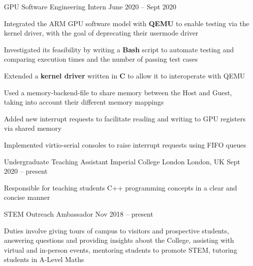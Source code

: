 \begin{cventries}
\cventry
{GPU Software Engineering Intern} %
{} %
{} %
{June 2020 -- Sept 2020} %
{
  \begin{cvitems} %
    \item Integrated the ARM GPU software model with \textbf{QEMU} to enable testing via the kernel driver, with the goal of deprecating their usermode driver
    \item Investigated its feasibility by writing a \textbf{Bash} script to automate testing and comparing execution times and the number of passing test cases
    \item Extended a \textbf{kernel driver} written in \textbf{C} to allow it to interoperate with QEMU
    \item Used a memory-backend-file to share memory between the Host and Guest, taking into account their different memory mappings
    \item Added new interrupt requests to facilitate reading and writing to GPU registers via shared memory
    \item Implemented virtio-serial consoles to raise interrupt requests using FIFO queues 
  \end{cvitems}
}


\cventry
{Undergraduate Teaching Assistant} %
{Imperial College London} %
{London, UK} %
{Sept 2020 -- present} %
{
  \begin{cvitems} %
    \item Responsible for teaching students C++ programming concepts in a clear and concise manner
  \end{cvitems}
}

\cventry
{STEM Outreach Ambassador} %
{} %
{} %
{Nov 2018 -- present} %
{
  \begin{cvitems} %
    \item Duties involve giving tours of campus to visitors and prospective students, answering questions and providing insights about the College, assisting with virtual and in-person events, mentoring students to promote STEM, tutoring students in A-Level Maths
  \end{cvitems}
}



\end{cventries}
